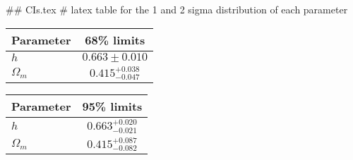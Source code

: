 ## CIs.tex
# latex table for the 1 and 2 sigma distribution of each parameter

\begin{tabular} { l  c}
 Parameter &  68\% limits\\
\hline
{\boldmath$h              $} & $0.663\pm 0.010            $\\
{\boldmath$\Omega_m       $} & $0.415^{+0.038}_{-0.047}   $\\
\hline
\end{tabular}

\begin{tabular} { l  c}
 Parameter &  95\% limits\\
\hline
{\boldmath$h              $} & $0.663^{+0.020}_{-0.021}   $\\
{\boldmath$\Omega_m       $} & $0.415^{+0.087}_{-0.082}   $\\
\hline
\end{tabular}

